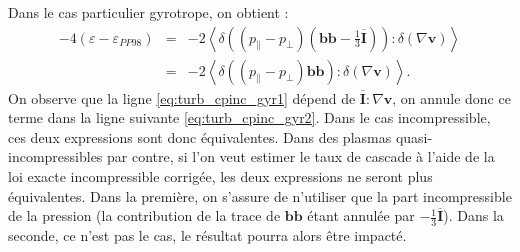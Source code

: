 Dans le cas particulier gyrotrope, on obtient :
\begin{eqnarray}
\label{eq:turb_cpinc_gyr1} 
- 4(\varepsilon - \varepsilon_{PP98}) &=& -2 \left< \delta ((p_{\parallel} - p_{\perp})(\boldsymbol{b}\boldsymbol{b} -\frac{1}{3} \overline{\boldsymbol{I}})):\delta (\nabla \boldsymbol{v}) \right> \\
\label{eq:turb_cpinc_gyr2} &=& -2 \left< \delta ((p_{\parallel} - p_{\perp})\boldsymbol{b}\boldsymbol{b}):\delta (\nabla \boldsymbol{v}) \right> .
\end{eqnarray}
On observe que la ligne \eqref{eq:turb_cpinc_gyr1} dépend de $\overline{\boldsymbol{I}} :\nabla \boldsymbol{v}$, on annule donc ce terme dans la ligne suivante \eqref{eq:turb_cpinc_gyr2}. Dans le cas incompressible, ces deux expressions sont donc équivalentes. Dans des plasmas quasi-incompressibles par contre, si l'on veut estimer le taux de cascade à l'aide de la loi exacte incompressible corrigée, les deux expressions ne seront plus équivalentes. Dans la première, on s'assure de n'utiliser que la part incompressible de la pression (la contribution de la trace de $\boldsymbol{b}\boldsymbol{b}$ étant annulée par $-\frac{1}{3} \overline{\boldsymbol{I}}$). Dans la seconde, ce n'est pas le cas, le résultat pourra alors être impacté.

